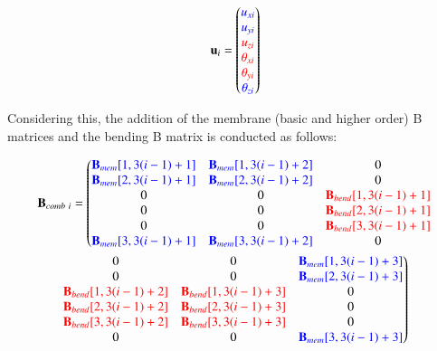 \begin{equation} 
\mathbf{u}_i = 
\begin{pmatrix}
\textcolor{blue}{u_{xi}} \\ 
\textcolor{blue}{u_{yi}} \\ 
\textcolor{red}{u_{zi}} \\ 
\textcolor{red}{\theta_{xi}} \\ 
\textcolor{red}{\theta_{yi}} \\ 
\textcolor{blue}{\theta_{zi}} \\ 
\end{pmatrix}
\label{equation32}
\end{equation}

Considering this, the addition of the membrane (basic and higher order) B matrices and the bending B matrix is conducted as follows:

\begin{multline}
	\mathbf{B}_{comb\ i} = \left(
	\begin{matrix}
		\textcolor{blue}{\mathbf{B}_{mem}[1,3(i-1) + 1]} & \textcolor{blue}{\mathbf{B}_{mem}[1,3(i-1) + 2]} & 0 \\ 
		\textcolor{blue}{\mathbf{B}_{mem}[2,3(i-1) + 1]} & \textcolor{blue}{\mathbf{B}_{mem}[2,3(i-1) + 2]} & 0 \\ 
		0 & 0 & \textcolor{red}{\mathbf{B}_{bend}[1,3(i-1) + 1]} \\ 
		0 & 0 & \textcolor{red}{\mathbf{B}_{bend}[2,3(i-1) + 1]} \\
		0 & 0 & \textcolor{red}{\mathbf{B}_{bend}[3,3(i-1) + 1]} \\
		\textcolor{blue}{\mathbf{B}_{mem}[3,3(i-1) + 1]} & \textcolor{blue}{\mathbf{B}_{mem}[3,3(i-1) + 2]} & 0 \\
	\end{matrix}\right.                
	\\
	\left.
	\begin{matrix}
		0 & 0 & \textcolor{blue}{\mathbf{B}_{mem}[1,3(i-1) + 3]} \\ 
		0 & 0 & \textcolor{blue}{\mathbf{B}_{mem}[2,3(i-1) + 3]} \\ 
		\textcolor{red}{\mathbf{B}_{bend}[1,3(i-1) + 2]} & \textcolor{red}{\mathbf{B}_{bend}[1,3(i-1) + 3]} & 0 \\ 
		\textcolor{red}{\mathbf{B}_{bend}[2,3(i-1) + 2]} & \textcolor{red}{\mathbf{B}_{bend}[2,3(i-1) + 3]} & 0 \\
		\textcolor{red}{\mathbf{B}_{bend}[3,3(i-1) + 2]} & \textcolor{red}{\mathbf{B}_{bend}[3,3(i-1) + 3]} & 0 \\
		0 & 0 & \textcolor{blue}{\mathbf{B}_{mem}[3,3(i-1) + 3]} \\
	\end{matrix}\right)
	\label{equation33}
\end{multline}

